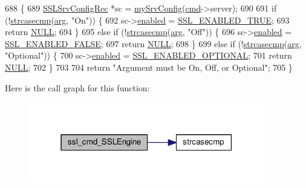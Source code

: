 \begin{DoxyCode}
688 \{
689     \hyperlink{structSSLSrvConfigRec}{SSLSrvConfigRec} *sc = \hyperlink{group__MOD__SSL__PRIVATE_ga3ea8e2c288a4f4af189ae0fc4f1fd996}{mySrvConfig}(\hyperlink{group__APACHE__CORE__DAEMON_ga504a7f40c3261db3e10e1d2776642dd6}{cmd}->server);
690 
691     \textcolor{keywordflow}{if} (!\hyperlink{apr__cpystrn_8c_a4a00fc29b96a953fed9e0107a9c4548a}{strcasecmp}(\hyperlink{group__APACHE__CORE__LISTEN_ga71f9d4c76ff7cd8f3db5697a5cfa7b08}{arg}, \textcolor{stringliteral}{"On"})) \{
692         sc->\hyperlink{structSSLSrvConfigRec_a79b2e4b68e2efe964c8a0d1e715830f3}{enabled} = \hyperlink{group__MOD__SSL__PRIVATE_gga2a6d65d4ff2b1083702c82c09325c299a24df4311d0483627f0e3d9c039bfe08c}{SSL\_ENABLED\_TRUE};
693         \textcolor{keywordflow}{return} \hyperlink{pcre_8txt_ad7f989d16aa8ca809a36bc392c07fba1}{NULL};
694     \}
695     \textcolor{keywordflow}{else} \textcolor{keywordflow}{if} (!\hyperlink{apr__cpystrn_8c_a4a00fc29b96a953fed9e0107a9c4548a}{strcasecmp}(\hyperlink{group__APACHE__CORE__LISTEN_ga71f9d4c76ff7cd8f3db5697a5cfa7b08}{arg}, \textcolor{stringliteral}{"Off"})) \{
696         sc->\hyperlink{structSSLSrvConfigRec_a79b2e4b68e2efe964c8a0d1e715830f3}{enabled} = \hyperlink{group__MOD__SSL__PRIVATE_gga2a6d65d4ff2b1083702c82c09325c299a68431c402a1002c08844d80b2c5a66b9}{SSL\_ENABLED\_FALSE};
697         \textcolor{keywordflow}{return} \hyperlink{pcre_8txt_ad7f989d16aa8ca809a36bc392c07fba1}{NULL};
698     \}
699     \textcolor{keywordflow}{else} \textcolor{keywordflow}{if} (!\hyperlink{apr__cpystrn_8c_a4a00fc29b96a953fed9e0107a9c4548a}{strcasecmp}(\hyperlink{group__APACHE__CORE__LISTEN_ga71f9d4c76ff7cd8f3db5697a5cfa7b08}{arg}, \textcolor{stringliteral}{"Optional"})) \{
700         sc->\hyperlink{structSSLSrvConfigRec_a79b2e4b68e2efe964c8a0d1e715830f3}{enabled} = \hyperlink{group__MOD__SSL__PRIVATE_gga2a6d65d4ff2b1083702c82c09325c299aa61fe8985418a7b4d5a852e7a03303b9}{SSL\_ENABLED\_OPTIONAL};
701         \textcolor{keywordflow}{return} \hyperlink{pcre_8txt_ad7f989d16aa8ca809a36bc392c07fba1}{NULL};
702     \}
703 
704     \textcolor{keywordflow}{return} \textcolor{stringliteral}{"Argument must be On, Off, or Optional"};
705 \}
\end{DoxyCode}


Here is the call graph for this function\+:
\nopagebreak
\begin{figure}[H]
\begin{center}
\leavevmode
\includegraphics[width=291pt]{group__MOD__SSL__PRIVATE_ga130bb4d9d6834fbef197653ee20dbc86_cgraph}
\end{center}
\end{figure}


